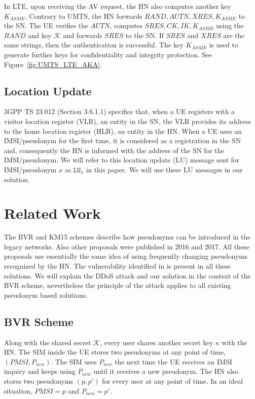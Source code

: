 \documentclass{llncs} %
\begin{document}
In LTE, upon receiving the AV request, the HN also computes another key $K_{ASME}$. Contrary to UMTS, the HN forwards $RAND,AUTN,XRES,K_{ASME}$ to the SN. The UE verifies the $AUTN$, computes $SRES,CK,IK, K_{ASME}$ using the $RAND$ and key $\mathcal{K}$ and forwards $SRES$ to the SN. If $SRES$ and $XRES$ are the same strings, then the authentication is successful. The key $K_{ASME}$ is used to generate further keys for confidentiality and integrity protection. See Figure~\ref{fig:UMTS_LTE_AKA}.



\subsection{Location Update} 3GPP TS 23.012 (Section 3.6.1.1) \cite{TS23012} specifies that, when a UE registers with a visitor location register (VLR), an entity in the SN, the  VLR provides its address to the home location register (HLR), an entity in the HN. When a UE uses an IMSI/pseudonym for the first time, it is considered as a registration in the SN and, consequently the HN is informed with the address of the SN for the IMSI/pseudonym. We will refer to this location update (LU) message sent for IMSI/pseudonym $x$ as $\texttt{LU}_{x}$ in this paper. We will use these LU messages in our solution.


\section{Related Work}
The BVR and KM15 schemes describe how pseudonyms can be introduced in the legacy networks. Also other proposals \cite{Ginzboorg_Niemi_2016,Norrman_Naslund_Dubrova_2016,yemen2017} were published in 2016 and 2017. All these proposals use essentially the same idea of using frequently changing pseudonyms recognized by the HN. The vulnerability identified in \cite{wisec17} is present in all these solutions. We will explain the DDoS attack and our solution in the context of the BVR scheme, nevertheless the principle of the attack applies to all existing pseudonym based solutions.

\subsection{BVR Scheme}
Along with the shared secret $\mathcal{K}$, every user shares another secret key $\kappa$ with the HN. The SIM inside the UE stores two pseudonyms at any point of time, $\left(PMSI,P_{new}\right)$. The SIM uses $P_{new}$ the next time the UE receives an IMSI inquiry and keeps using $P_{new}$ until it receives a new pseudonym. The HN also stores two pseudonyms $\left(p,p'\right)$ for every user at any point of time. In an ideal situation, $PMSI = p$ and $P_{new} = p'$. 
\end{document}
